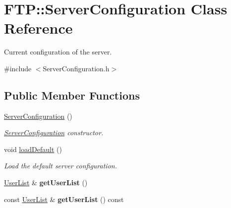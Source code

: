 \hypertarget{classFTP_1_1ServerConfiguration}{}\section{F\+T\+P\+:\+:Server\+Configuration Class Reference}
\label{classFTP_1_1ServerConfiguration}


Current configuration of the server.  




{\ttfamily \#include $<$Server\+Configuration.\+h$>$}

\subsection*{Public Member Functions}
\begin{DoxyCompactItemize}
\item 
\hypertarget{classFTP_1_1ServerConfiguration_a3bd14902cfa646699d2d782d95de673a}{}\hyperlink{classFTP_1_1ServerConfiguration_a3bd14902cfa646699d2d782d95de673a}{Server\+Configuration} ()\label{classFTP_1_1ServerConfiguration_a3bd14902cfa646699d2d782d95de673a}

\begin{DoxyCompactList}\small\item\em \hyperlink{classFTP_1_1ServerConfiguration}{Server\+Configuration} constructor. \end{DoxyCompactList}\item 
\hypertarget{classFTP_1_1ServerConfiguration_a11b98a6266117f6a3e18640dbd532c2b}{}void \hyperlink{classFTP_1_1ServerConfiguration_a11b98a6266117f6a3e18640dbd532c2b}{load\+Default} ()\label{classFTP_1_1ServerConfiguration_a11b98a6266117f6a3e18640dbd532c2b}

\begin{DoxyCompactList}\small\item\em Load the default server configuration. \end{DoxyCompactList}\item 
\hypertarget{classFTP_1_1ServerConfiguration_aef31c0113abb25ab40875212fda7172e}{}\hyperlink{classFTP_1_1UserList}{User\+List} \& {\bfseries get\+User\+List} ()\label{classFTP_1_1ServerConfiguration_aef31c0113abb25ab40875212fda7172e}

\item 
\hypertarget{classFTP_1_1ServerConfiguration_a08aced6da32db6cdc904f5a8292869d7}{}const \hyperlink{classFTP_1_1UserList}{User\+List} \& {\bfseries get\+User\+List} () const \label{classFTP_1_1ServerConfiguration_a08aced6da32db6cdc904f5a8292869d7}


\end{DoxyCompactItemize}
